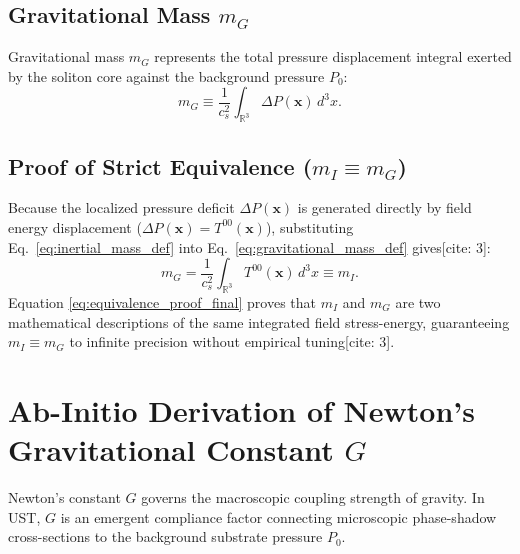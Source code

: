 \documentclass[11pt,a4paper]{article}
\begin{document}
	\subsection{Gravitational Mass $m_G$}
	\label{sec:gravitational_mass_def}
	Gravitational mass $m_G$ represents the total pressure displacement integral exerted by the soliton core against the background pressure $P_0$:
	\begin{equation}
		m_G \equiv \frac{1}{c_s^2} \int_{\mathbb{R}^3} \Delta P(\mathbf{x}) \, d^3x.
		\label{eq:gravitational_mass_def}
	\end{equation}
	
	\subsection{Proof of Strict Equivalence ($m_I \equiv m_G$)}
	Because the localized pressure deficit $\Delta P(\mathbf{x})$ is generated directly by field energy displacement ($\Delta P(\mathbf{x}) = T^{00}(\mathbf{x})$), substituting Eq.\ \eqref{eq:inertial_mass_def} into Eq.\ \eqref{eq:gravitational_mass_def} gives[cite: 3]:
	\begin{equation}
		m_G = \frac{1}{c_s^2} \int_{\mathbb{R}^3} T^{00}(\mathbf{x}) \, d^3x \equiv m_I.
		\label{eq:equivalence_proof_final}
	\end{equation}
	Equation \eqref{eq:equivalence_proof_final} proves that $m_I$ and $m_G$ are two mathematical descriptions of the same integrated field stress-energy, guaranteeing $m_I \equiv m_G$ to infinite precision without empirical tuning[cite: 3].
	
	\section{Ab-Initio Derivation of Newton's Gravitational Constant $G$}
	\label{sec:G_derivation}
	
	Newton's constant $G$ governs the macroscopic coupling strength of gravity. In UST, $G$ is an emergent compliance factor connecting microscopic phase-shadow cross-sections to the background substrate pressure $P_0$.
	
\end{document}
